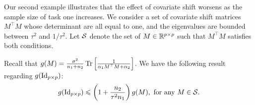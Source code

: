 Our second example illustrates that the effect of covariate shift worsens as the sample size of task one increases.
We consider a set of covariate shift matrices $M^{\top} M$ whose determinant are all equal to one, and the eigenvalues are bounded between $\tau^2$ and $1 / \tau^2$.
Let $\mathcal{S}$ denote the set of $M\in\mathbb{R}^{p\times p}$ such that $M^{\top} M$ satisfies both conditions.
\begin{proposition}\label{prop_covariate}
    Recall that $g(M) = \frac{\sigma^2}{n_1 + n_2} \operatorname{Tr}\left[\frac 1 {\alpha_1 M^{\top} M + \alpha_2}\right]$.
	We have the following result regarding $g(\operatorname{Id}_{p \times p})$:
	\begin{align} g(\id_{p\times p}) \le \bigbrace{1+ {\frac{n_2}{\tau^2 n_1}  }} g(M), \text{ for any } M \in \cS. \label{eq_claim_id}
	\end{align}
\end{proposition}
